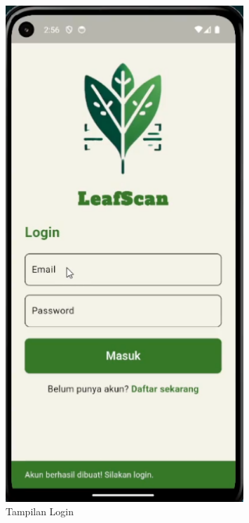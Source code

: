 \documentclass[journal,article,submit,pdftex,moreauthors]{Definitions/mdpi}
\begin{document}
\begin{itemize}
     \begin{itemize}
                \begin{figure}[H]
            \centering
            \begin{minipage}{0.45\textwidth}
                \centering
                \includegraphics[width=0.8\textwidth]{Images/login_view.png}
                \caption{\centering Tampilan Login}
                \label{fig:login-view}
            \end{minipage}
            \hfill
            \begin{minipage}{0.45\textwidth}
                \centering

\end{minipage}
\end{figure}
\end{itemize}
\end{itemize}
\end{document}
